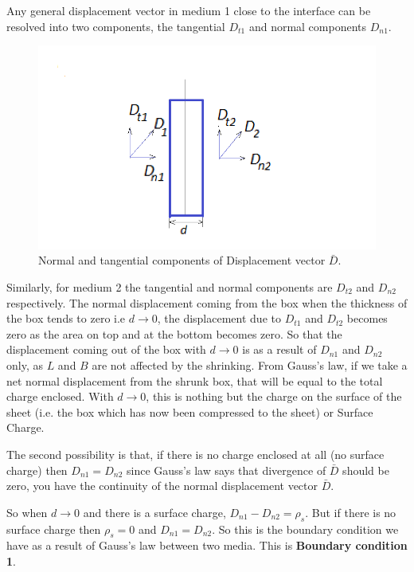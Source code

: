 Any general displacement vector in medium 1 close to the interface can be resolved into two components, the tangential $D_{t1}$ and normal components $D_{n1}$. 
\begin{figure}[h]
\centering
\includegraphics[width=1\linewidth]{./graphics/diemedium3}
\caption{Normal and tangential components of Displacement vector $\bar{D}$.}
\end{figure}
Similarly, for medium 2 the tangential and normal components are $D_{t2}$ and $D_{n2}$ respectively. The normal displacement coming from the box when the thickness of the box tends to zero i.e $d \longrightarrow 0$, the displacement due to $D_{t1}$ and $D_{t2}$ becomes zero as the area on top and at the bottom becomes zero. So that the displacement coming out of the box with $d \longrightarrow 0$ is as a result of $D_{n1}$ and $D_{n2}$ only, as $L$ and $B$ are not affected by the shrinking. From Gauss's law, if we take a net normal displacement from the shrunk box, that will be equal to the total charge enclosed. With $d \longrightarrow 0$, this is nothing but the charge on the surface of the sheet (i.e. the box which has now been compressed to the sheet) or Surface Charge.

The second possibility is that, if there is no charge enclosed at all (no surface charge) then $D_{n1}= D_{n2}$ since Gauss's law says that divergence of $\bar{D}$ should be zero, you have the continuity of the normal displacement vector $\bar{D}$.

So when 
$d \longrightarrow 0$ and there is a surface charge, $D_{n1}- D_{n2} = \rho_s$. But if there is no surface charge then $\rho_s = 0$ and $D_{n1}= D_{n2}$. So this is the boundary condition we have as a result of Gauss's law between two media. This is \textbf{Boundary condition 1}.


